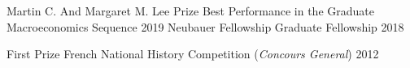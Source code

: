 

\begin{cvhonors}

	\cvhonor
	{Martin C. And Margaret M. Lee Prize} %
	{Best Performance in the Graduate Macroeconomics Sequence} %
	{} %
	{2019} %
	\cvhonor
	{Neubauer Fellowship} %
	{Graduate Fellowship} %
	{} %
	{2018} %

	\cvhonor
	{First Prize} %
	{French National History Competition (\textit{Concours General})} %
	{} %
	{2012} %

\end{cvhonors}
